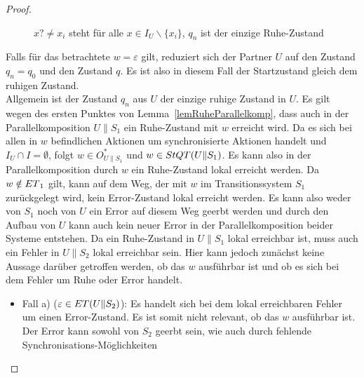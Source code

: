 \begin{proof}
\begin{figure} [h!tbp]
\begin{center}
    \caption{$x?\neq x_i$ steht für alle $x\in I_U\backslash\{x_i\}$, $q_n$
    ist der einzige Ruhe-Zustand}
\label{UohneEmitI}
  \end{center}
  \end{figure}
  Falls für das betrachtete $w =\varepsilon$ gilt, reduziert sich der Partner
  $U$ auf den Zustand $q_n =q_0$ und den Zustand $q$. Es ist also in diesem
  Fall der Startzustand gleich dem ruhigen Zustand.\\
  Allgemein ist der Zustand $q_n$ aus $U$ der einzige ruhige Zustand in $U$. Es gilt
  wegen des ersten Punktes von Lemma~\ref{lemRuheParallelkomp}, dass auch in
  der Parallelkomposition $U\|S_1$ ein Ruhe-Zustand mit $w$ erreicht wird. Da
  es sich bei allen in $w$ befindlichen Aktionen um synchronisierte
  Aktionen handelt und $I_U\cap I=\emptyset$, folgt $w\in O_{U\|S_1}^*$ und
  $w\in StQT{}(U\|S_1)$. Es kann also in der Parallelkomposition durch $w$
  ein Ruhe-Zustand lokal erreicht werden. Da $w\notin ET{}_1$ gilt, kann
  auf dem Weg, der mit $w$ im Transitionssystem $S_1$ zurückgelegt wird,
  kein Error-Zustand lokal erreicht werden. Es kann also weder von $S_1$ noch von
  $U$ ein Error auf diesem Weg geerbt werden und durch den Aufbau von $U$
  kann auch kein neuer Error in der Parallelkomposition beider Systeme
  entstehen. Da ein Ruhe-Zustand in $U\|S_1$
  lokal erreichbar ist, muss auch ein Fehler in $U\|S_2$ lokal erreichbar
  sein. Hier kann jedoch zunächst keine Aussage darüber getroffen werden,
  ob das $w$ ausführbar ist und ob es sich bei dem Fehler um Ruhe oder
  Error handelt.
  \begin{itemize}
    \item Fall a) ($\varepsilon\in ET{}(U\|S_2)$): Es handelt sich bei
      dem lokal erreichbaren Fehler um einen Error-Zustand. Es ist somit nicht
      relevant, ob das $w$ ausführbar ist. Der Error kann sowohl von $S_2$
      geerbt sein, wie auch durch fehlende Synchronisations-Möglichkeiten

\end{itemize}
\end{proof}
